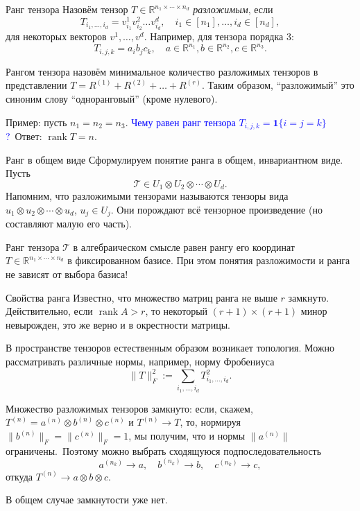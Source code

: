 \documentclass[handout]{beamer}
\newcommand\R{\mathbb R}
\DeclareMathOperator{\rank}{rank}
\begin{document}
\begin{frame}{Ранг тензора}
    Назовём тензор $T\in\R^{n_1\times\cdots\times n_d}$ \textit{разложимым}, если
    $$
    T_{i_1,\ldots,i_d}=v^1_{i_1}v^2_{i_2}\ldots v^d_{i_d},\quad
    i_1\in[n_1],\ldots,i_d\in[n_d],
    $$
    для некоторых векторов $v^1,\ldots,v^d$. Например, для тензора порядка 3:
    $$
    T_{i,j,k} = a_ib_jc_k,\quad a\in\R^{n_1},b\in\R^{n_2},c\in\R^{n_3}.
    $$
    \pause\vspace{5pt}

    Рангом тензора назовём минимальное количество разложимых тензоров в
    представлении $T=R^{(1)}+R^{(2)}+\ldots+R^{(r)}$. Таким образом,
    ``разложимый'' это синоним слову ``одноранговый'' (кроме нулевого).
    \pause\vspace{5pt}

    Пример: пусть $n_1=n_2=n_3$. \textcolor{blue}{Чему равен ранг тензора
    $T_{i,j,k}=\mathbf{1}\{i=j=k\}$?}\pause~Ответ: $\rank T=n$.
\end{frame}

\begin{frame}{Ранг в общем виде}
    Сформулируем понятие ранга в общем, инвариантном виде. Пусть
    $$
    \mathcal T\in U_1\otimes U_2\otimes\cdots\otimes U_d.
    $$
    Напомним, что разложимыми тензорами называются тензоры вида $u_1\otimes
    u_2\otimes\cdots\otimes u_d$, $u_j\in U_j$. Они порождают всё тензорное
    произведение (но составляют малую его часть).
    \pause\vspace{5pt}

    Ранг тензора $\mathcal T$ в алгебраическом смысле равен рангу его координат
    $T\in\R^{n_1\times\cdots\times n_d}$ в фиксированном базисе. При этом
    понятия разложимости и ранга не зависят от выбора базиса!
\end{frame}


\begin{frame}{Свойства ранга}
    Известно, что множество матриц ранга не выше $r$ замкнуто. Действительно,
    если $\rank A>r$, то некоторый $(r+1)\times (r+1)$ минор невырожден, это же
    верно и в окрестности матрицы.
    \pause\vspace{5pt}

    В пространстве тензоров естественным образом возникает топология. Можно
    рассматривать различные нормы, например, норму Фробениуса
    $$
    \|T\|_F^2 := \sum_{i_1,\ldots,i_d} T_{i_1,\ldots,i_d}^2.
    $$
    \pause\vspace{5pt}

    Множество разложимых тензоров замкнуто: если, скажем,
    $T^{(n)}=a^{(n)}\otimes b^{(n)}\otimes c^{(n)}$ и $T^{(n)}\to T$, то,
    нормируя $\|b^{(n)}\|_F=\|c^{(n)}\|_F = 1$, мы получим, что и нормы
    $\|a^{(n)}\|$ ограничены.\pause~Поэтому можно выбрать сходящуюся
    подпоследовательность
    $$
    a^{(n_k)}\to a,\quad b^{(n_k)}\to b,\quad c^{(n_k)}\to c,
    $$
    откуда $T^{(n)}\to a\otimes b\otimes c$.
    \pause

    В общем случае замкнутости уже нет.
\end{frame}
\end{document}

